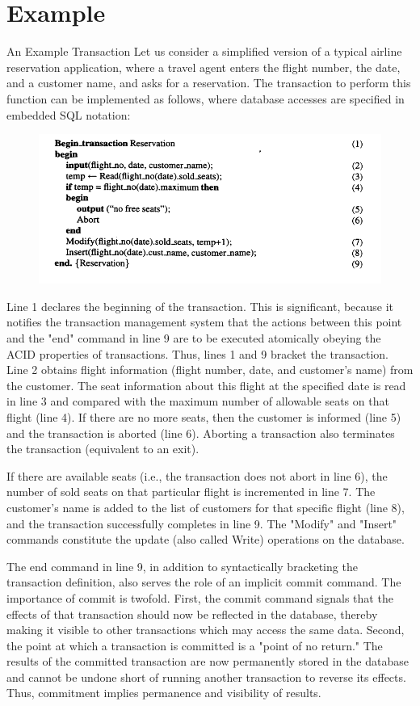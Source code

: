 \documentclass{article}
\begin{document}
\section*{Example}
An Example Transaction 
Let us consider a simplified version of a typical airline reservation application, where a travel agent enters the flight number, the date, and a customer name, and asks for a reservation. The transaction to perform this function can be implemented as follows, where database accesses are specified in embedded SQL notation: 

\begin{figure}[h]
 \centering
 \includegraphics{images}
\end{figure}


Line 1 declares the beginning of the transaction. This is significant, because it notifies the transaction management system that the actions between this point and the "end" command in line 9 are to be executed atomically obeying the ACID properties of transactions. Thus, lines 1 and 9 bracket the transaction. 
Line 2 obtains flight information (flight number, date, and customer's name) from the customer. The seat information about this flight at the specified date is read in line 3 and compared with the maximum number of allowable seats on that flight (line 4). If there are no more seats, then the customer is informed (line 5) and the transaction is aborted (line 6). Aborting a transaction also terminates the transaction (equivalent to an exit). 

If there are available seats (i.e., the transaction does not abort in line 6), the number of sold seats on that particular flight is incremented in line 7. The customer's name is added to the list of customers for that specific flight (line 8), and the transaction successfully completes in line 9. The "Modify" and "Insert" commands constitute the update (also called Write) operations on the database.

The end command in line 9, in addition to syntactically bracketing the transaction definition, also serves the role of an implicit commit command. The importance of commit is twofold. First, the commit command signals that the effects of that transaction should now be reflected in the database, thereby making it visible to other transactions which may access the same data. Second, the point at which a transaction is committed is a "point of no return." The results of the committed transaction are now permanently stored in the database and cannot be undone short of running another transaction to reverse its effects. Thus, commitment implies permanence and visibility of results.
\end{document}
